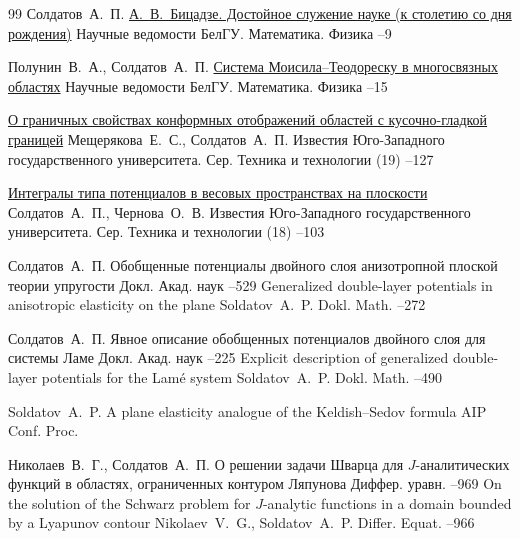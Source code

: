 \begin{thebibliography}{99}
\by Солдатов~А.~П.
\paper \href{http://elibrary.ru/item.asp?id=29201715}{А.~В.~Бицадзе. Достойное служение науке (к столетию со дня рождения)}
\jour Научные ведомости БелГУ. Математика. Физика
--9


\by Полунин~В.~А., Солдатов~А.~П.
\paper \href{http://elibrary.ru/item.asp?id=29201716}{Система Моисила–Теодореску в многосвязных областях}
\jour Научные ведомости БелГУ. Математика. Физика
--15


\paper \href{https://elibrary.ru/item.asp?id=26723918}{О граничных свойствах конформных отображений областей с кусочно-гладкой границей}
\by Мещерякова~Е.~С., Солдатов~А.~П.
\jour Известия Юго-Западного государственного университета. Сер. Техника и технологии
(19)
--127

\paper \href{https://elibrary.ru/item.asp?id=25942190}{Интегралы типа потенциалов в весовых пространствах на плоскости}
\by Солдатов~А.~П., Чернова~О.~В.
\jour Известия Юго-Западного государственного университета. Сер. Техника и технологии
(18)
--103

\by Солдатов~А.~П.
\paper Обобщенные потенциалы двойного слоя анизотропной плоской теории упругости
\jour Докл. Акад. наук
--529
\transl
{}
\paper Generalized double-layer potentials in anisotropic elasticity on the plane
\by Soldatov~A.~P.
\jour Dokl. Math.
--272

\by Солдатов~А.~П.
\paper  Явное описание обобщенных потенциалов двойного слоя для системы Ламе
\jour Докл. Акад. наук
--225
\transl
{}
\paper Explicit description of generalized double-layer potentials for the Lamé system
\by \linebreak Soldatov~A.~P.
\jour Dokl. Math.
--490

\by Soldatov~A.~P.
\paper A plane elasticity analogue of the Keldish--Sedov formula
\jour AIP Conf. Proc.

\by Николаев~В.~Г., Солдатов~А.~П.
\paper О решении задачи Шварца для $J$-аналитических функций в областях, ограниченных контуром Ляпунова
\jour Диффер. уравн.
--969
\transl
\paper On the solution of the Schwarz problem for $J$-analytic functions in a domain bounded by a Lyapunov contour
\by Nikolaev~V.~G., Soldatov~A.~P.
\jour Differ. Equat.
--966


\end{thebibliography}
